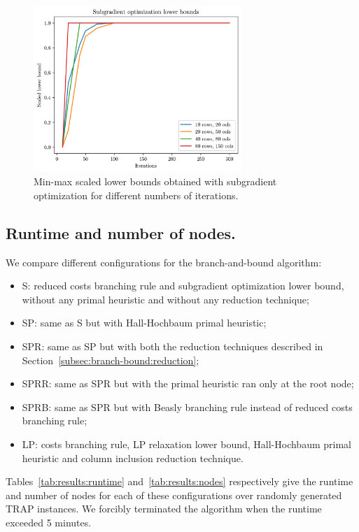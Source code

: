 \documentclass[runningheads]{llncs}
\begin{document}
\begin{figure}
  \center
  \includegraphics[width=0.7\textwidth]{img/subgrad_lb.png}
  \caption{Min-max scaled lower bounds obtained with subgradient optimization for different numbers of iterations.} 
  \label{fig:results:subgrad}
\end{figure}

\subsection{Runtime and number of nodes.} We compare different configurations for the branch-and-bound algorithm:
\begin{itemize}
  \item S: reduced costs branching rule and subgradient optimization lower bound, without any primal heuristic and without any reduction technique;
  \item SP: same as S but with Hall-Hochbaum primal heuristic;
  \item SPR: same as SP but with both the reduction techniques described in Section~\ref{subsec:branch-bound:reduction};
  \item SPRR: same as SPR but with the primal heuristic ran only at the root node;
  \item SPRB: same as SPR but with Beasly branching rule instead of reduced costs branching rule;
  \item LP: costs branching rule, LP relaxation lower bound, Hall-Hochbaum primal heuristic and column inclusion reduction technique.
\end{itemize}

Tables~\ref{tab:results:runtime} and~\ref{tab:results:nodes} respectively give the runtime and number of nodes for each of these configurations over randomly generated TRAP instances. We forcibly terminated the algorithm when the runtime exceeded 5 minutes. 
\end{document}
